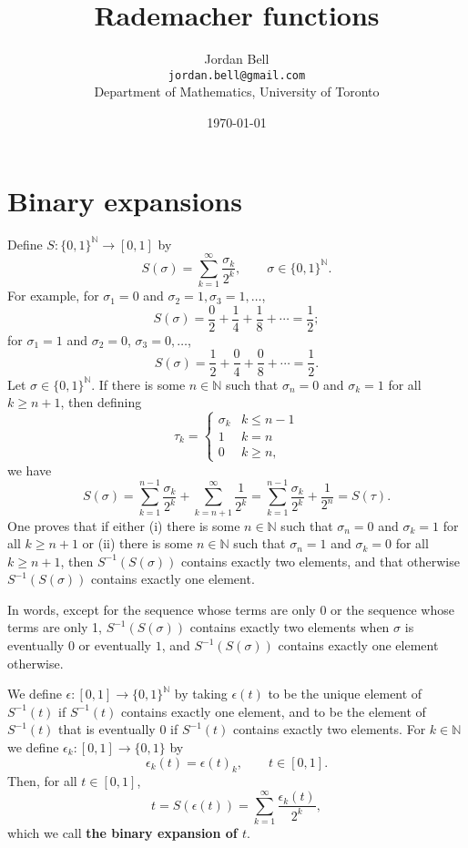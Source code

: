 \documentclass{article}
\theoremstyle{definition}
\begin{document}
\title{Rademacher functions}
\author{Jordan Bell\\ \texttt{jordan.bell@gmail.com}\\Department of Mathematics, University of Toronto}
\date{\today}

\maketitle


\section{Binary expansions}
Define $S:\{0,1\}^\mathbb{N} \to [0,1]$ by
\[
S(\sigma) = \sum_{k=1}^\infty \frac{\sigma_k}{2^k}, \qquad \sigma \in \{0,1\}^\mathbb{N}.
\]
For example, for $\sigma_1=0$ and $\sigma_2=1,\sigma_3=1,\ldots$, 
\[
S(\sigma) = \frac{0}{2}+\frac{1}{4}+\frac{1}{8}+\cdots = \frac{1}{2};
\]
  for $\sigma_1=1$ and $\sigma_2=0$, $\sigma_3=0, \ldots$,
\[
S(\sigma) = \frac{1}{2}+\frac{0}{4}+\frac{0}{8} + \cdots = \frac{1}{2}.
\]
Let $\sigma \in \{0,1\}^\mathbb{N}$. If there is some $n  \in \mathbb{N}$ such that $\sigma_n=0$ and $\sigma_k=1$ for all $k \geq n+1$, then
defining
\[
\tau_k = \begin{cases}
\sigma_k&k \leq n-1\\
1&k=n\\
0&k \geq n,
\end{cases}
\]
we have
\[
S(\sigma) = \sum_{k=1}^{n-1} \frac{\sigma_k}{2^k} + \sum_{k=n+1}^\infty \frac{1}{2^k} = 
 \sum_{k=1}^{n-1} \frac{\sigma_k}{2^k} + \frac{1}{2^n}
 =S(\tau).
\]
One proves that if either (i) there is some $n \in \mathbb{N}$ such that
$\sigma_n=0$ and $\sigma_k=1$ for all $k \geq n+1$ or (ii) there is some $n \in \mathbb{N}$
such that $\sigma_n=1$ and $\sigma_k=0$ for all $k \geq n+1$, then $S^{-1}(S(\sigma))$ contains exactly two elements, and that
otherwise $S^{-1}(S(\sigma))$ contains exactly one element. 

In words, except for the sequence whose terms are only 0 or the sequence whose terms are only 1, $S^{-1}(S(\sigma))$ contains
exactly two elements when $\sigma$ is eventually $0$ or eventually $1$, and $S^{-1}(S(\sigma))$ contains exactly
one element otherwise.

We define $\epsilon:[0,1] \to \{0,1\}^\mathbb{N}$ by taking $\epsilon(t)$
to be  the unique element of $S^{-1}(t)$ if $S^{-1}(t)$ contains exactly one element, and to be the element of $S^{-1}(t)$
that is eventually $0$ if $S^{-1}(t)$ contains exactly two elements.
For $k \in \mathbb{N}$ we define $\epsilon_k:[0,1] \to \{0,1\}$ by
\[
\epsilon_k(t) = \epsilon(t)_k, \qquad t \in [0,1].
\]
Then, for all $t \in [0,1]$,
\begin{equation}
t =S(\epsilon(t))= \sum_{k=1}^\infty \frac{\epsilon_k(t)}{2^k},
\label{binexpansion}
\end{equation}
which we call \textbf{the binary expansion of $t$}.
\end{document}
